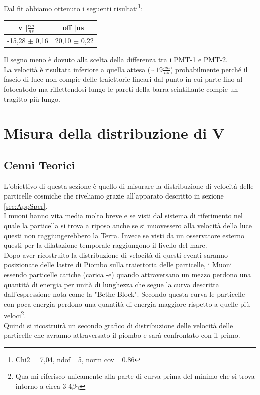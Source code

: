 \documentclass[a4paper]{article}
\begin{document}
Dal fit abbiamo ottenuto i seguenti risultati\footnote{Chi2 = 7,04, ndof= 5, norm cov= 0.86}:

\begin{tabular}{|c|c|}
\hline
v [$\frac{cm}{ns}$] & off [ns] \\
\hline
-15,28 $\pm$ 0,16 & 20,10 $\pm$ 0,22\\
\hline
\end{tabular}

Il segno meno è dovuto alla scelta della differenza tra i PMT-1 e PMT-2.\\
La velocità è risultata inferiore a quella attesa ($\sim 19\frac{cm}{ns}$) probabilmente perché il fascio di luce non compie delle traiettorie lineari dal punto in cui parte fino al fotocatodo ma riflettendosi lungo le pareti della barra scintillante compie un tragitto più lungo.



\newpage
\section{Misura della distribuzione di V}
\label{sec:MisuraVMu}
\subsection{Cenni Teorici}
L'obiettivo di questa sezione è quello di misurare la distribuzione di velocità delle particelle cosmiche che riveliamo grazie all'apparato descritto in sezione \ref{sec:AppSper}.\\
I muoni hanno vita media molto breve e se visti dal sistema di riferimento nel quale la particella si trova a riposo anche se si muovessero alla velocità della luce questi non raggiungerebbero la Terra. Invece se visti da un osservatore esterno questi per la dilatazione temporale raggiungono il livello del mare.\\
Dopo aver ricostruito la distribuzione di velocità di questi eventi saranno posizionate delle lastre di Piombo sulla traiettoria delle particelle, i Muoni essendo particelle cariche (carica -e) quando attraversano un mezzo perdono una quantità di energia per unità di lunghezza che segue la curva descritta dall'espressione nota come la "Bethe-Block". Secondo questa curva le particelle con poca energia perdono una quantità di energia maggiore rispetto a quelle più veloci\footnote{Qua mi riferisco unicamente alla parte di curva prima del minimo che si trova intorno a circa 3-4$\beta \gamma$}.\\
Quindi si ricostruirà un secondo grafico di distribuzione delle velocità delle particelle che avranno attraversato il piombo e sarà confrontato con il primo.
\end{document}
